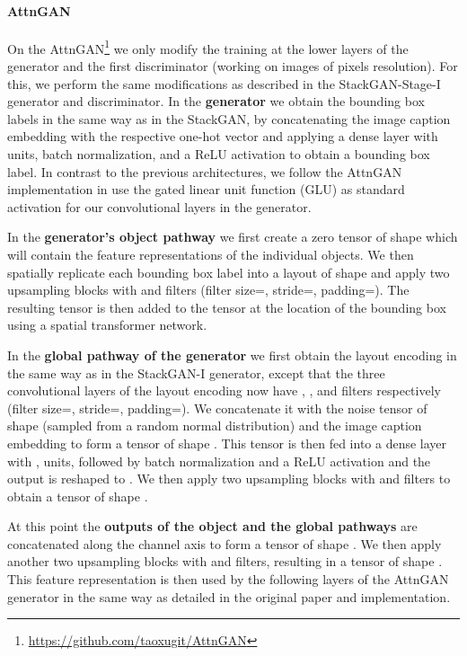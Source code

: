 \documentclass{article} \usepackage{iclr2019_conference,times}
\begin{document}
	\paragraph{AttnGAN}
	On the AttnGAN\footnote{\url{https://github.com/taoxugit/AttnGAN}} we only modify the training at the lower layers of the generator and the first discriminator (working on images of  pixels resolution).
	For this, we perform the same modifications as described in the StackGAN-Stage-I generator and discriminator.
	In the \textbf{generator} we obtain the bounding box labels in the same way as in the StackGAN, by concatenating the image caption embedding with the respective one-hot vector and applying a dense layer with  units, batch normalization, and a ReLU activation to obtain a bounding box label.
	In contrast to the previous architectures, we follow the AttnGAN implementation in use the gated linear unit function (GLU) as standard activation for our convolutional layers in the generator.
	
	In the \textbf{generator's object pathway} we first create a zero tensor  of shape  which will contain the feature representations of the individual objects.
	We then spatially replicate each bounding box label into a  layout of shape  and apply two upsampling blocks with  and  filters (filter size=, stride=, padding=).
	The resulting tensor is then added to the tensor  at the location of the bounding box using a spatial transformer network.
	
	In the \textbf{global pathway of the generator} we first obtain the layout encoding in the same way as in the StackGAN-I generator, except that the three convolutional layers of the layout encoding now have , , and  filters respectively (filter size=, stride=, padding=).
	We concatenate it with the noise tensor of shape  (sampled from a random normal distribution) and the image caption embedding to form a tensor of shape .
	This tensor is then fed into a dense layer with , units, followed by batch normalization and a ReLU activation and the output is reshaped to .
	We then apply two upsampling blocks with  and  filters to obtain a tensor of shape .
	
	At this point the \textbf{outputs of the object and the global pathways} are concatenated along the channel axis to form a tensor of shape .
	We then apply another two upsampling blocks with  and  filters, resulting in a tensor of shape .
	This feature representation is then used by the following layers of the AttnGAN generator in the same way as detailed in the original paper and implementation.
	
\end{document}
